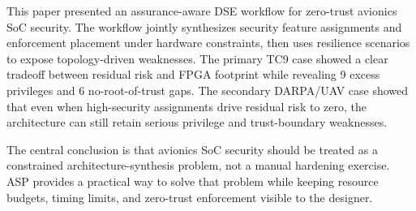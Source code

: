 \documentclass[conference]{IEEEtran}
\begin{document}
This paper presented an assurance-aware DSE workflow for zero-trust avionics
SoC security. The workflow jointly synthesizes security feature assignments
and enforcement placement under hardware constraints, then uses resilience
scenarios to expose topology-driven weaknesses. The primary TC9 case showed a
clear tradeoff between residual risk and FPGA footprint while revealing 9
excess privileges and 6 no-root-of-trust gaps. The secondary DARPA/UAV case
showed that even when high-security assignments drive residual risk to zero,
the architecture can still retain serious privilege and trust-boundary
weaknesses.

The central conclusion is that avionics SoC security should be treated as a
constrained architecture-synthesis problem, not a manual hardening exercise.
ASP provides a practical way to solve that problem while keeping resource
budgets, timing limits, and zero-trust enforcement visible to the designer.

\balance


\end{document}

